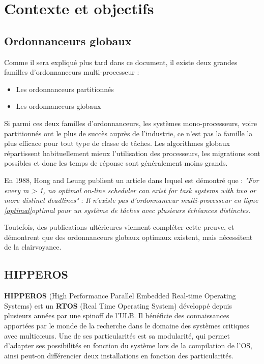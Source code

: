 \documentclass[11pt,a4paper,oneside]{report}
\begin{document}
	\section{Contexte et objectifs}
	
	\subsection{Ordonnanceurs globaux}
	Comme il sera expliqué plus tard dans ce document, il existe deux grandes familles d'ordonnanceurs 
	multi-processeur :\medskip
	\begin{itemize}
		\item Les ordonnanceurs partitionnés
		\item Les ordonnanceurs globaux
	\end{itemize}
	Si parmi ces deux familles d'ordonnanceurs, les systèmes mono-processeurs, voire 
	partitionnés ont le plus de succès auprès de l'industrie, 
	ce n'est pas la famille la plus efficace pour tout type de classe de tâches. 
	Les algorithmes globaux répartissent habituellement mieux l'utilisation des processeurs, 
	les migrations sont possibles et donc les temps de réponse sont généralement moins grands.
	\medskip
	
	
	En 1988, Hong and Leung \cite{hong_-line_1988} publient un article dans lequel est 
	démontré que : \medskip
	\textit{"For every m > 1, no optimal on-line scheduler can exist for task systems with two or more distinct deadlines"} : 
	\textit{Il n'existe pas d'ordonnanceur multi-processeur en ligne \ref{optimal}{optimal} pour un système de tâches 
		avec plusieurs échéances distinctes}.
	
	Toutefois, des publications ultérieures viennent compléter cette preuve, et démontrent 
	que des ordonnanceurs globaux optimaux existent, mais nécessitent de la clairvoyance.
	
	\subsection{HIPPEROS}
	\textbf{HIPPEROS} (High Performance Parallel Embedded Real-time Operating Systems)
	est un \textbf{RTOS} (Real Time Operating System) développé depuis plusieurs années par une spinoff de l'ULB.
	Il bénéficie des connaissances apportées par le monde de la recherche dans 
	le domaine des systèmes critiques avec multic\oe{}urs. Une de ses particularités 
	est sa modularité, qui permet d'adapter ses possibilités en fonction du système 
	lors de la compilation de l'OS, ainsi peut-on différencier deux installations 
	en fonction des particularités.
	
\end{document}
